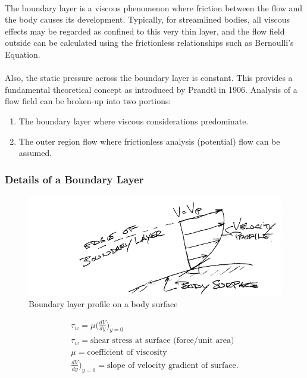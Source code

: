 \documentclass[draft=false, titlepage]{article}
\begin{document}
\paragraph*{} The boundary layer is a viscous phenomenon where friction between the flow and the body causes its development. Typically, for streamlined bodies, all viscous effects may be regarded as confined to this very thin layer, and the flow field outside can be calculated using the frictionless relationships such as Bernoulli's Equation.
\paragraph*{} Also, the static pressure across the boundary layer is constant. This provides a fundamental theoretical concept as introduced by Prandtl in 1906. Analysis of a flow field can be broken-up into two portions:

\begin{enumerate}
	\item The boundary layer where viscous considerations predominate.
	\item The outer region flow where frictionless analysis (potential) flow can be assumed.
\end{enumerate}

\subsubsection{Details of a Boundary Layer}
\begin{figure}[ht]
	\centering
	\includegraphics[width=0.6\linewidth]{Figures/p17_velocityProfile1.PNG}
	\caption{Boundary layer profile on a body surface}
	\label{fig:p17_boundaryLayer1}
\end{figure}
\begin{gather*}
\tau_w = \mu \Big( \frac{dV}{dy} \Big)_{y=0}\\
\tau_w = \text{shear stress at surface (force/unit area)}\\
\mu = \text{coefficient of viscosity}\\
\frac{dV}{dy}\Big)_{y=0} = \text{slope of velocity gradient of surface.}
\end{gather*}
\end{document}
